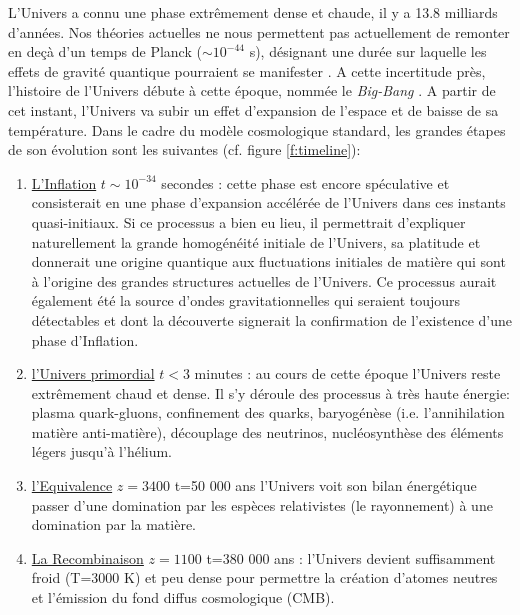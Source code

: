 L'Univers a connu une phase extrêmement dense et chaude, il y a 13.8 milliards d'années. Nos théories actuelles ne nous permettent pas actuellement de remonter en deçà d'un temps de Planck ($\sim 10^{-44}$ s),  désignant une durée sur laquelle les effets de gravité quantique pourraient se manifester . A cette incertitude près, l'histoire de l'Univers débute à cette époque, nommée le \textit{Big-Bang} . A partir de cet instant, l'Univers va subir un effet d'expansion de l'espace et de baisse de sa température. Dans le cadre du modèle cosmologique standard, les grandes étapes de son évolution sont les suivantes (cf. figure \ref{f:timeline}):
\begin{enumerate}
\item \underline{L'Inflation} $t\sim 10^{-34}$ secondes :  cette phase est encore spéculative et consisterait en une phase d'expansion accélérée de l'Univers dans ces instants quasi-initiaux. Si ce processus a bien eu lieu, il permettrait d'expliquer naturellement la grande homogénéité initiale de l'Univers, sa platitude et donnerait une origine quantique aux fluctuations initiales de matière qui sont à l'origine des grandes structures actuelles de l'Univers. Ce processus aurait également été la source d'ondes gravitationnelles qui seraient toujours détectables et dont la découverte signerait la confirmation de l'existence d'une phase d'Inflation.
\item \underline{l'Univers primordial} $t<3$ minutes : au cours de cette époque l'Univers reste extrêmement chaud et dense. Il s'y déroule des processus à très haute énergie: plasma quark-gluons, confinement des quarks, baryogénèse (i.e. l'annihilation matière anti-matière), découplage des neutrinos, nucléosynthèse des éléments légers jusqu'à l'hélium.
\item \underline{l'Equivalence} $z=3400$ t=50 000 ans  l'Univers voit son bilan énergétique passer d'une domination par les espèces relativistes (le rayonnement) à une domination par la matière.
\item \underline{La Recombinaison} $z=1100$ t=380 000 ans : l'Univers devient suffisamment froid (T=3000 K) et peu dense pour permettre la création d'atomes neutres et l'émission du fond diffus cosmologique (CMB). 

\end{enumerate}
